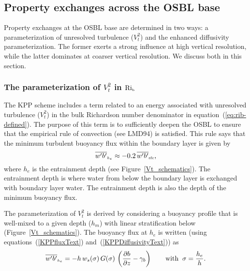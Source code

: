 \documentclass[preprint,12pt,authoryear]{agujournal}
\begin{document}
\subsection{Property exchanges across the OSBL base}
\label{section:entrainment}

Property exchanges at the OSBL base are determined in two ways: a parameterization of unresolved turbulence ($V_t^2$) and the enhanced diffusivity parameterization.  The former exerts a strong influence at high vertical resolution, while the latter dominates at coarser vertical resolution.  We discuss both in this section.

\subsubsection{The parameterization of $V_t^2$ in $\mbox{Ri}_{\mbox{\tiny b}}$}
\label{section:vt2}

The KPP scheme includes a term related to an energy associated with unresolved turbulence ($V_t^2$) in the bulk Richardson number denominator in equation~(\ref{eq:rib-defined}).  The purpose of this term is to sufficiently deepen the OSBL to ensure that the empirical rule of convection (see LMD94) is satisfied.  This rule says that the minimum turbulent buoyancy flux within the boundary layer is given by 
\begin{equation}
 \overline{w^\prime b^\prime}_{\mbox{\tiny $h_e$}} 
 \approx 
 -0.2 \,  
 \overline{w^\prime b^\prime}_{\mbox{\tiny sfc}},
 \label{eq:empiricalRuleConvection}
 \end{equation}
where $h_e$ is the entrainment depth (see Figure~\ref{Vt_schematics}).  The entrainment depth is where water from below the boundary layer is exchanged with boundary layer water.  The entrainment depth is also the depth of the minimum buoyancy flux.  

The parameterization of $V_t^2$ is derived by considering a buoyancy profile that is well-mixed to a given depth ($h_m$) with linear stratification below (Figure~\ref{Vt_schematics}).  The buoyancy flux at $h_e$ is written (using equations~(\ref{KPPfluxText}) and~(\ref{KPPDiffusivityText})) as
\begin{equation}
\label{buoyFluxhe}
\overline{w^\prime b^\prime}_{\mbox{\tiny $h_e$}} = -h \, w_s(\sigma) \, G(\sigma) \, 
\left(\frac{\partial b}{\partial z} - \gamma_b \right)
\qquad \mbox{with} \; \; \sigma =  \frac{h_e}{h}.
\end{equation}
\end{document}
